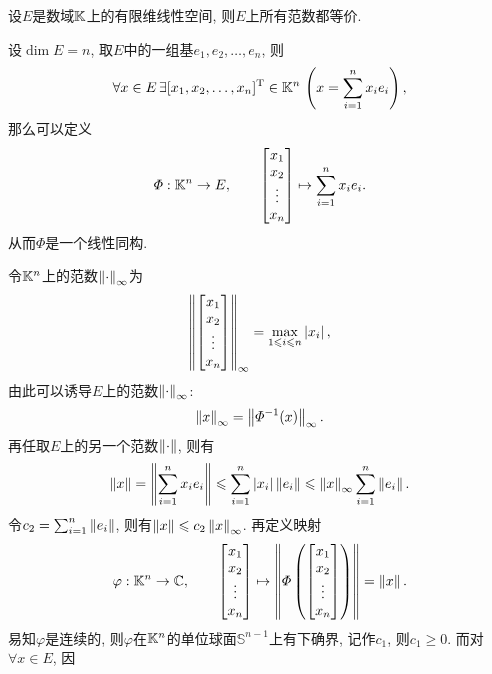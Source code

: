    \begin{Theorem}
    设$ E $是数域$ \mathbb{K} $上的有限维线性空间, 则$ E $上所有范数都等价.
    \end{Theorem}
    \begin{Proof}
    设$ \dim E=n $, 取$ E $中的一组基$ e_1,e_2, \dots,e_n $, 则
    \[
    \forall x\in E\,\exists[x_1,x_2, \dots,x_n]^\mathrm{T}\in\mathbb{K}^n\,\left( x=\sum_{i=1}^nx_ie_i \right),
    \]
    那么可以定义
    \[
    \varPhi : \mathbb{K}^n\to E,\qquad \begin{bmatrix}
    x_1\\x_2\\\vdots\\x_n
    \end{bmatrix}\mapsto\sum_{i=1}^nx_ie_i.
    \]
    从而$ \varPhi $是一个线性同构.

    令$ \mathbb{K}^n $上的范数$ \left\| \cdot \right\|_\infty $为
    \[
    \left\| \begin{bmatrix}x_1\\x_2\\\vdots\\x_n\end{bmatrix} \right\|_\infty=\max_{1\leqslant i\leqslant n}\left| x_i \right| ,
    \]
    由此可以诱导$ E $上的范数$ \left\| \cdot \right\|_\infty $:
    \[
    \left\| x \right\|_\infty=\left\| \varPhi^{-1}(x) \right\|_\infty.
    \]
    再任取$ E $上的另一个范数$ \left\| \cdot \right\| $, 则有
    \[
    \left\| x \right\|=\left\| \sum_{i=1}^nx_ie_i \right\|\leqslant\sum_{i=1}^n\left| x_i \right| \left\| e_i \right\|\leqslant\left\| x \right\|_\infty\sum_{i=1}^n\left\| e_i \right\|.
    \]
    令$ c_2=\sum_{i=1}^n\left\| e_i \right\| $, 则有$ \left\| x \right\|\leqslant c_2\left\| x \right\|_\infty $. 再定义映射
    \[
    \varphi : \mathbb{K}^n\to\mathbb{C},\qquad\begin{bmatrix}x_1\\x_2\\\vdots\\x_n\end{bmatrix}\mapsto\left\| \varPhi\left(\begin{bmatrix}
    x_1\\x_2\\\vdots\\x_n
    \end{bmatrix}\right) \right\|=\left\| x \right\|.
    \]
    易知$ \varphi $是连续的, 则$ \varphi $在$ \mathbb{K}^n $的单位球面$ \mathbb{S}^{n-1} $上有下确界, 记作$ c_1 $, 则$ c_1\geqslant 0 $. 而对$ \forall x\in E $, 因
    \[
\]
\end{Proof}

